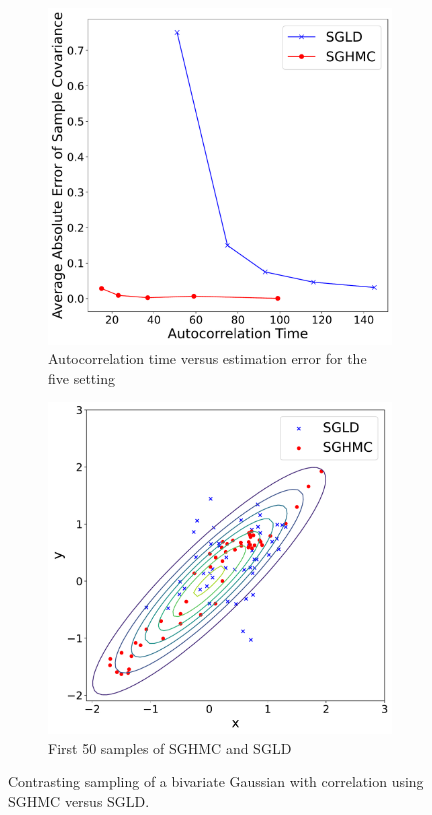 \begin{figure}[h!]
\begin{subfigure}{.5\textwidth}
\includegraphics[width=.95\linewidth]{parts/Images/fig3a.pdf}
\caption{Autocorrelation time versus estimation error for the five setting}
\label{fig:a}
\end{subfigure}%
\begin{subfigure}{.5\textwidth}
\includegraphics[width=.95\linewidth]{parts/Images/fig3b.pdf}
\caption{First 50 samples of SGHMC and SGLD}
\label{fig:b}
\end{subfigure}
\caption{Contrasting sampling of a bivariate Gaussian with correlation using SGHMC versus SGLD.}
\label{fig:demo}
\end{figure}

